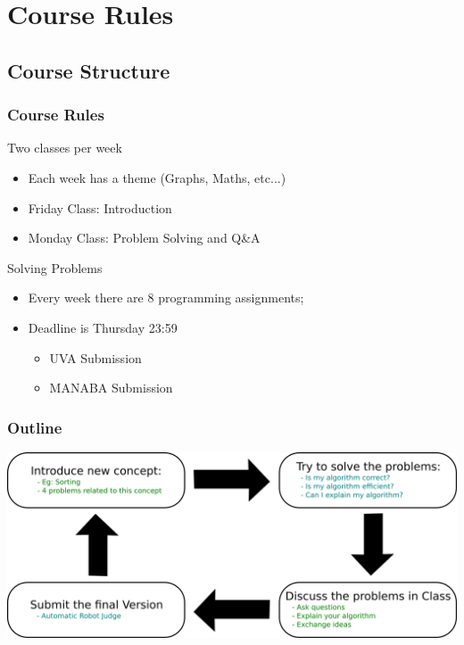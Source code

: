 \documentclass{beamer}
\begin{document}
\section{Course Rules}
\subsection{Course Structure}

\begin{frame}
    \frametitle{Course Rules}

    \begin{block}{Two classes per week}
        \begin{itemize}
        \item Each week has a theme (Graphs, Maths, etc...)
        \item Friday Class: Introduction
        \item Monday Class: Problem Solving and Q\&A
        \end{itemize}
    \end{block}

    \begin{block}{Solving Problems}
        \begin{itemize}
        \item Every week there are 8 programming assignments;
        \item Deadline is Thursday 23:59
        \begin{itemize}
          \item UVA Submission
          \item MANABA Submission
        \end{itemize}
        \end{itemize}
    \end{block}
\end{frame}

\begin{frame}
  \frametitle{Outline}
  \begin{center}
    \includegraphics[width=1\textwidth]{../img/classoutline}
  \end{center}
\end{frame}
\end{document}
